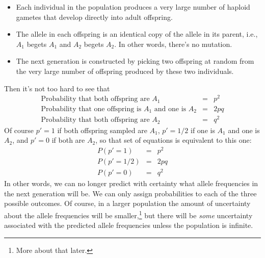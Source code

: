 \documentclass[12pt]{article}
\begin{document}
\begin{itemize}

\item Each individual in the population produces a very large number
  of haploid gametes that develop directly into adult offspring.

\item The allele in each offspring is an identical copy of the allele
  in its parent, i.e., $A_1$ begets $A_1$ and $A_2$ begets $A_2$. In
  other words, there's no mutation.

\item The next generation is constructed by picking two offspring at
  random from the very large number of offspring produced by these two
  individuals.

\end{itemize}

\noindent Then it's not too hard to see that
\begin{eqnarray*}
\mbox{Probability that both offspring are $A_1$} &=& p^2 \\
\mbox{Probability that one offspring is $A_1$ and one is $A_2$} &=& 2pq \\
\mbox{Probability that both offspring are $A_2$} &=& q^2
\end{eqnarray*}
Of course $p' = 1$ if both offspring sampled are $A_1$, $p' = 1/2$ if
one is $A_1$ and one is $A_2$, and $p' = 0$ if both are $A_2$, so that
set of equations is equivalent to this one:
\begin{eqnarray}
P(p'=1) &=& p^2  \label{eq:p-1} \\
P(p'=1/2) &=& 2pq \\
P(p'=0) &=& q^2  \label{eq:p-2}
\end{eqnarray}
In other words, we can no longer predict with certainty what allele
frequencies in the next generation will be. We can only assign
probabilities to each of the three possible outcomes. Of course, in a
larger population the amount of uncertainty about the allele
frequencies will be smaller,\footnote{More about that later.} but
there will be {\it some\/} uncertainty associated with the predicted
allele frequencies unless the population is infinite.
\end{document}
